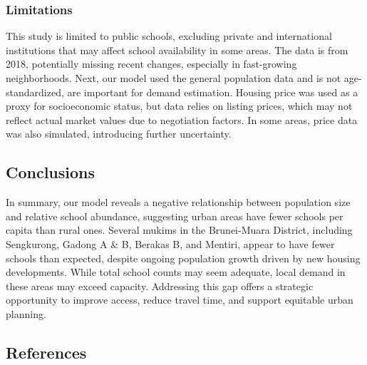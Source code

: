 \documentclass[
  12pt,
]{article}
\begin{document}
\subsubsection{Limitations}\label{limitations}

This study is limited to public schools, excluding private and
international institutions that may affect school availability in some
areas. The data is from 2018, potentially missing recent changes,
especially in fast-growing neighborhoods. Next, our model used the
general population data and is not age-standardized, are important for
demand estimation. Housing price was used as a proxy for socioeconomic
status, but data relies on listing prices, which may not reflect actual
market values due to negotiation factors. In some areas, price data was
also simulated, introducing further uncertainty.

\subsection{Conclusions}\label{sec-conc}

In summary, our model reveals a negative relationship between population
size and relative school abundance, suggesting urban areas have fewer
schools per capita than rural ones. Several mukims in the Brunei-Muara
District, including Sengkurong, Gadong A \& B, Berakas B, and Mentiri,
appear to have fewer schools than expected, despite ongoing population
growth driven by new housing developments. While total school counts may
seem adequate, local demand in these areas may exceed capacity.
Addressing this gap offers a strategic opportunity to improve access,
reduce travel time, and support equitable urban planning.

\subsection*{References}\label{references}
\end{document}
